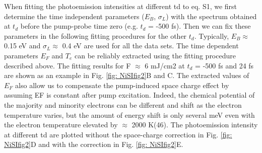 When fitting the photoemission intensities at different td to eq. S1, we first determine the time independent parameters ($E_B$, $\sigma_L$) with the spectrum obtained at $t_d$ before the pump-probe time zero (e.g. $t_d$ = -500 fs). Then we can fix these parameters in the following fitting procedures for the other $t_d$. Typically, $E_B \approx$ 0.15 eV and $\sigma_L \approx$ 0.4 eV are used for all the data sets. The time dependent parameters $E_F$ and $T_e$ can be reliably extracted using the fitting procedure described above. The fitting results for F $\approx$ 6 mJ/cm2 at $t_d$ = -500 fs and 24 fs are shown as an example in Fig. \ref{fig: NiSIfig2}B and C. The extracted values of $E_F$ also allow us to compensate the pump-induced space charge effect by assuming EF is constant after pump excitation. Indeed, the chemical potential of the majority and minority electrons can be different and shift as the electron temperature varies, but the amount of energy shift is only several meV even with the electron temperature elevated by $\approx$ 2000 K(46). The photoemission intensity at different td are plotted without the space-charge correction in Fig. \ref{fig: NiSIfig2}D and with the correction in Fig. \ref{fig: NiSIfig2}E.

